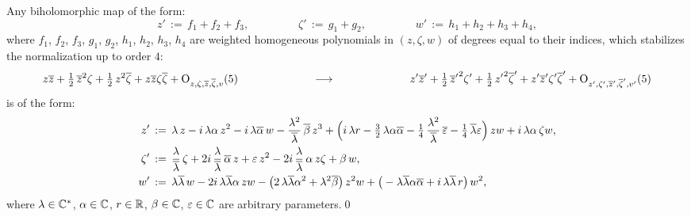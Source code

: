 \documentclass[12pt,twoside,leqno,openany]{amsart}
\begin{document}
\begin{Lemma}
\label{Lm-stability-order-4}
Any biholomorphic map of the form:
\[
z'
\,:=\,
f_1+f_2+f_3,
\ \ \ \ \ \ \ \ \ \ \ \ \ \ \ \ \ \ \ \
\zeta'
\,:=\,
g_1+g_2,
\ \ \ \ \ \ \ \ \ \ \ \ \ \ \ \ \ \ \ \
w'
\,:=\,
h_1+h_2+h_3+h_4,
\]
where $f_1$, $f_2$, $f_3$, $g_1$, $g_2$, $h_1$, $h_2$, 
$h_3$, $h_4$ are weighted homogeneous polynomials
in $(z, \zeta, w)$ of degrees equal to their
indices,
which stabilizes the normalization up to order $4$:
\[
z\overline{z}
+
\tfrac{1}{2}\,\overline{z}^2\zeta
+
\tfrac{1}{2}\,z^2\overline{\zeta}
+
z\overline{z}\zeta\overline{\zeta}
+
{\rm O}_{z,\zeta,\overline{z},\overline{\zeta},v}(5)
\ \ \ \ \ \ \ \ \ \ \ \ \ \ \ \ \ \ \ \
\longrightarrow
\ \ \ \ \ \ \ \ \ \ \ \ \ \ \ \ \ \ \ \
z'\overline{z}'
+
\tfrac{1}{2}\,{\overline{z}'}^2\zeta'
+
\tfrac{1}{2}\,{z'}^2\overline{\zeta}'
+
z'\overline{z}'\zeta'\overline{\zeta}'
+
{\rm O}_{z',\zeta',\overline{z}',\overline{\zeta}',v'}(5)
\]
is of the form:
\[
\aligned
z'
&
\,:=\,
\lambda\,z
-
i\,\lambda\alpha\,z^2
-
i\,\lambda\overline{\alpha}\,w
-
\frac{\lambda^2}{\overline{\lambda}}\,
\overline{\beta}\,
z^3
+
\Big(
i\,\lambda r
-
\tfrac{3}{2}\,
\lambda\alpha\overline{\alpha}
-
\tfrac{1}{4}\,
\frac{\lambda^2}{\overline{\lambda}}\,
\overline{\varepsilon}
-
\tfrac{1}{4}\,
\overline{\lambda}\varepsilon
\Big)\,
zw
+
i\,\lambda\alpha\,
\zeta w,
\\
\zeta'
&
\,:=\,
\frac{\lambda}{\overline{\lambda}}\,\zeta
+
2i\,\frac{\lambda}{\overline{\lambda}}\,\overline{\alpha}\,
z
+
\varepsilon\,z^2
-
2i\,\frac{\lambda}{\overline{\lambda}}\,\alpha\,
z\zeta
+
\beta\,w,
\\
w'
&
\,:=\,
\lambda\overline{\lambda}\,w
-
2i\,\lambda\overline{\lambda}\alpha\,
zw
-
\big(
2\,\lambda\overline{\lambda}\alpha^2
+
\lambda^2\overline{\beta}
\big)\,
z^2w
+
\big(
-\lambda\overline{\lambda}\alpha\overline{\alpha}
+
i\,\lambda\overline{\lambda}\,r
\big)\,w^2,
\endaligned
\]
where $\lambda \in \mathbb{C}^\ast$, $\alpha \in \mathbb{C}$, $r \in \mathbb{R}$,
$\beta \in \mathbb{C}$, $\varepsilon \in \mathbb{C}$ are arbitrary
parameters.\qed
\end{Lemma}
\end{document}
